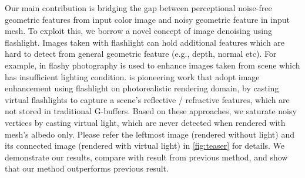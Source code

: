 Our main contribution is bridging the gap between perceptional noise-free geometric features from input color image and noisy geometric feature in input mesh. 
To exploit this, we borrow a novel concept of image denoising using flashlight. Images taken with flashlight can hold additional features which are hard to detect from general geometric feature (e.g., depth, normal etc). 
For example, in \cite{eisemann2004flash} \cite{petschnigg2004digital} flashy photography is used to enhance images taken from scene which has insufficient lighting condition. 
\cite{moon2013robust} is pioneering work that adopt image enhancement using flashlight on photorealistic rendering domain, by casting virtual flashlights to capture a scene’s reflective / refractive features, which are not stored in traditional G-buffers. 
Based on these approaches, we saturate noisy vertices by casting virtual light, which are never detected when rendered with mesh’s albedo only. 
Please refer the leftmost image (rendered without light) and its connected image (rendered with virtual light) in \ref{fig:teaser} for details. 
We demonstrate our results, compare with result from previous method, and show that our method outperforms previous result.